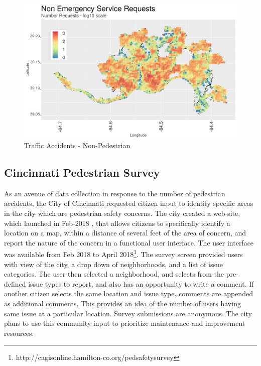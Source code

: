 \documentclass{llncs}
\begin{document}
\FloatBarrier
\begin{figure}
 	\includegraphics[width=\textwidth, height=\textheight, keepaspectratio]{nonEmergencyNumRequests}
 	\caption{Traffic Accidents - Non-Pedestrian}
	\label{figure : nonEmergencyNumRequests}
\end{figure}
\FloatBarrier


\subsection{Cincinnati Pedestrian Survey}

As an avenue of data collection in response to the number of pedestrian accidents, the City of Cincinnati requested citizen input to identify specific areas in the city which are pedestrian safety concerns. The city created a web-site, which launched in Feb-2018 \cite{cvg2018city}, that allows citizens to specifically identify a location on a map, within a distance of several feet of the area of concern, and report the nature of the concern in a functional user interface. The user interface was available from Feb 2018 to April 2018\footnote{http://cagisonline.hamilton-co.org/pedsafetysurvey}\cite{cvg2018city}. The survey screen provided users with view of the city, a drop down of neighborhoods, and a list of issue categories. The user then selected a neighborhood, and selects from the pre-defined issue types to report, and also has an opportunity to write a comment. If another citizen selects the same location and issue type, comments are appended as additional comments. This provides an idea of the number of users having same issue at a particular location. Survey submissions are anonymous. The city plans to use this community input to prioritize maintenance and improvement resources.
\end{document}
